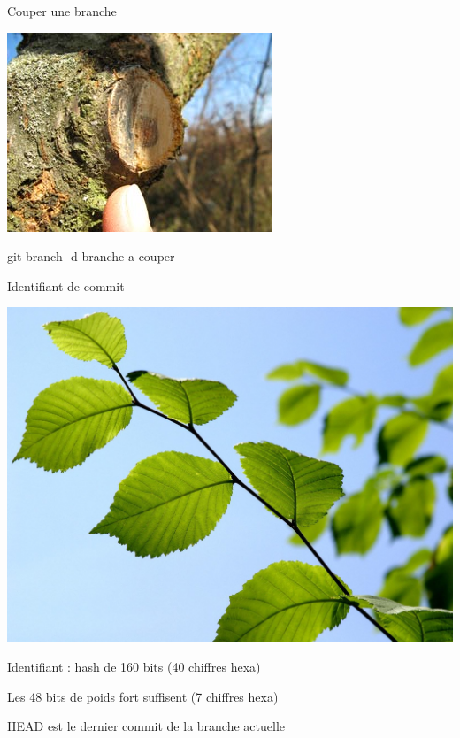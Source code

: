 \begin{frame}{Couper une branche}
\begin{center}
\includegraphics[scale=0.7]{scie-collet-branche.jpg}

git branch -d branche-a-couper
\end{center}
\end{frame}

\begin{frame}{Identifiant de commit}
\begin{center}
\includegraphics[scale=0.12]{feuille-arbre2.jpg}

Identifiant : hash de 160 bits (40 chiffres hexa)

Les 48 bits de poids fort suffisent (7 chiffres hexa)

HEAD est le dernier commit de la branche actuelle
\end{center}
\end{frame}

